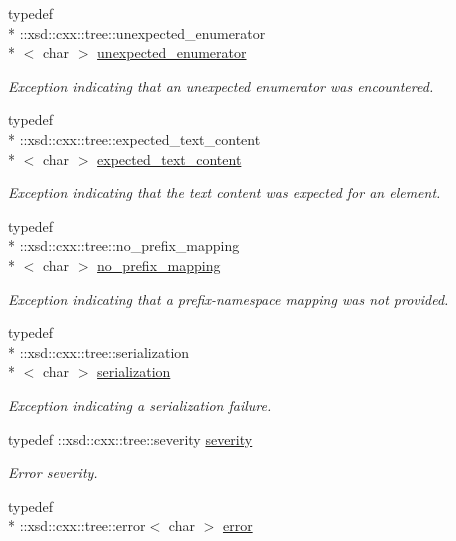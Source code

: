 \begin{DoxyCompactItemize}
typedef \\*
\-::xsd\-::cxx\-::tree\-::unexpected\-\_\-enumerator\\*
$<$ char $>$ \hyperlink{namespacexml__schema_aa088274f605e06cd53d9062265b5229c}{unexpected\-\_\-enumerator}
\begin{DoxyCompactList}\small\item\em Exception indicating that an unexpected enumerator was encountered. \end{DoxyCompactList}\item 
typedef \\*
\-::xsd\-::cxx\-::tree\-::expected\-\_\-text\-\_\-content\\*
$<$ char $>$ \hyperlink{namespacexml__schema_a1994323b3f5fee8db7891f02bb9144b9}{expected\-\_\-text\-\_\-content}
\begin{DoxyCompactList}\small\item\em Exception indicating that the text content was expected for an element. \end{DoxyCompactList}\item 
typedef \\*
\-::xsd\-::cxx\-::tree\-::no\-\_\-prefix\-\_\-mapping\\*
$<$ char $>$ \hyperlink{namespacexml__schema_a03293581f2c90a05fbb910be49380e01}{no\-\_\-prefix\-\_\-mapping}
\begin{DoxyCompactList}\small\item\em Exception indicating that a prefix-\/namespace mapping was not provided. \end{DoxyCompactList}\item 
typedef \\*
\-::xsd\-::cxx\-::tree\-::serialization\\*
$<$ char $>$ \hyperlink{namespacexml__schema_a40e04a11c9e6204762591b4de3755899}{serialization}
\begin{DoxyCompactList}\small\item\em Exception indicating a serialization failure. \end{DoxyCompactList}\item 
typedef \-::xsd\-::cxx\-::tree\-::severity \hyperlink{namespacexml__schema_aaac8e21420b35e58ad94533db40ccf41}{severity}
\begin{DoxyCompactList}\small\item\em Error severity. \end{DoxyCompactList}\item 
typedef \\*
\-::xsd\-::cxx\-::tree\-::error$<$ char $>$ \hyperlink{namespacexml__schema_a13e2122658f2abee3c2da9829f2de129}{error}

\end{DoxyCompactItemize}
